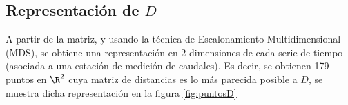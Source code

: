 \documentclass[12pt,oneside]{book}\usepackage[]{graphicx}\usepackage[]{color}
\theoremstyle{definition} %
\begin{document}
% 
% 


\subsection{Representación de $D$}

A partir de la matriz, y usando la técnica de Escalonamiento Multidimensional (MDS), se obtiene una representación en 2 dimensiones de cada serie de tiempo (asociada a una estación de medición de caudales). Es decir, se obtienen 179 puntos en $\R^2$ cuya matriz de distancias es lo más parecida posible a $D$, se muestra dicha representación en la figura \ref{fig:puntosD}
\end{document}
